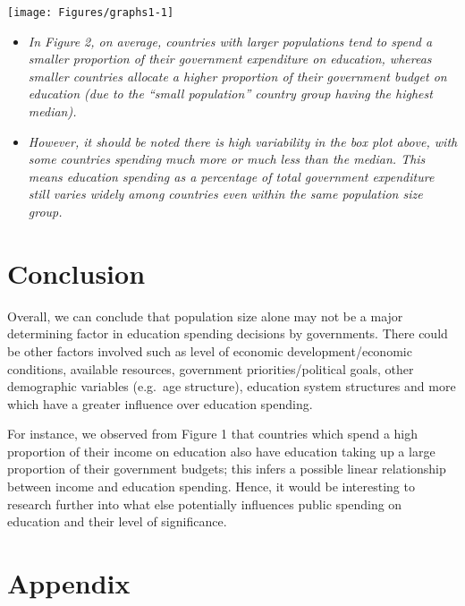 \documentclass[
]{article}
\providecommand{\tightlist}{%
  \setlength{\itemsep}{0pt}\setlength{\parskip}{0pt}}
\begin{document}
\begin{center}\texttt{[image: Figures/graphs1-1]} \end{center}

\begin{itemize}
\tightlist
\item
  \emph{In Figure 2, on average, countries with larger populations tend to spend a smaller proportion of their government expenditure on education, whereas smaller countries allocate a higher proportion of their government budget on education (due to the ``small population'' country group having the highest median).}
\item
  \emph{However, it should be noted there is high variability in the box plot above, with some countries spending much more or much less than the median. This means education spending as a percentage of total government expenditure still varies widely among countries even within the same population size group.}
\end{itemize}

\hypertarget{conclusion}{%
\section{\texorpdfstring{\textbf{Conclusion}}{Conclusion}}\label{conclusion}}

Overall, we can conclude that population size alone may not be a major determining factor in education spending decisions by governments. There could be other factors involved such as level of economic development/economic conditions, available resources, government priorities/political goals, other demographic variables (e.g.~age structure), education system structures and more which have a greater influence over education spending.

For instance, we observed from Figure 1 that countries which spend a high proportion of their income on education also have education taking up a large proportion of their government budgets; this infers a possible linear relationship between income and education spending. Hence, it would be interesting to research further into what else potentially influences public spending on education and their level of significance.

\hypertarget{appendix}{%
\section{\texorpdfstring{\textbf{Appendix}}{Appendix}}\label{appendix}}
\end{document}
